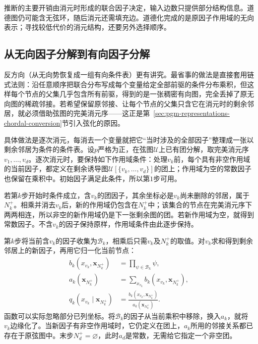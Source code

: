 推断的主要开销由消元时形成的联合因子决定，输入边数只提供部分结构信息。道德图仍可能含无弦环，随后消元还需填充边。道德化完成的是原因子作用域的无向表示；寻找较低代价的消元结构，还要另外选择顺序。

\subsection{从无向因子分解到有向因子分解}
\label{sec:pgm-representations-undirected-to-directed}

反方向（从无向势恢复成一组有向条件表）更有讲究。最省事的做法是直接套用链式法则：沿任意顺序把联合分布写成每个变量给定全部前驱的条件分布乘积，但这样每个节点的父集几乎包含所有前驱，得到的是一张稠密有向图，完全丢掉了原无向图的稀疏邻接。若希望保留原邻接、让每个节点的父集只含它在消元时的剩余邻居，就必须借助弦图的完美消元序——这正是第~\ref{sec:pgm-representations-chordal-conversion}节引入弦化的原因。

具体做法是逐次消元，每消去一个变量就把它“当时涉及的全部因子”整理成一张以剩余邻居为条件的条件表。设$p$严格为正，在弦图$\mathcal{U}$上已有团分解，取完美消元序$v_1,\ldots,v_d$。逐次消元时，要保持如下作用域条件：处理$v_k$前，每个具有非空作用域的当前因子，都定义在剩余诱导图$\mathcal{U}[\{v_k,\ldots,v_d\}]$的团上；作用域为空的常数因子也保留在乘积中。初始因子满足此条件，所以第$1$步可用。

若第$k$步开始时条件成立，含$v_k$的团因子，其余坐标必是$v_k$尚未删除的邻居，属于$N_k^+$。相乘并消去$v_k$后，新的作用域仍包含在$N_k^+$中；该集合的节点在完美消元序下两两相连，所以非空的新作用域仍是下一张剩余图的团。若新作用域为空，就得到常数因子。不含$v_k$的因子保持原样，作用域条件由此逐步保持。

第$k$步将当前含$v_k$的因子收集为$\mathcal{B}_k$，相乘后只需$v_k$及$N_k^+$的取值。对$v_k$求和得到剩余邻居上的新因子，再用它归一化当前节点：
\begin{equation}
  \begin{aligned}
    b_k(x_{v_k},\bm{x}_{N_k^+})
    &=\prod_{\psi\in\mathcal{B}_k}\psi,\\
    a_k(\bm{x}_{N_k^+})
    &=\sum_{x_{v_k}}b_k(x_{v_k},\bm{x}_{N_k^+}),\\
    q_k(x_{v_k}\mid\bm{x}_{N_k^+})
    &=\frac{b_k(x_{v_k},\bm{x}_{N_k^+})}
    {a_k(\bm{x}_{N_k^+})}.
  \end{aligned}
  \label{eq:pgm-representations-bucket-normalization}
\end{equation}
函数可以实际忽略部分已列坐标。将$\mathcal{B}_k$的因子从当前乘积中移除，换入$a_k$，就将$v_k$边缘化了。当新因子有非空作用域时，它仍定义在团上，$a_k$所用的邻接关系都已存在于原弦图中。末步$N_d^+=\varnothing$，此时$a_d$是常数，无需给它指定一个非空团。

